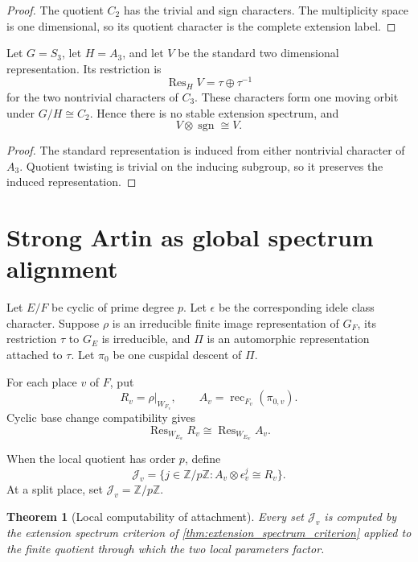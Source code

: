 \documentclass{aomart}
\newtheorem{theorem}{Theorem}[section]
\theoremstyle{definition}
\theoremstyle{remark}
\newcommand{\ZZ}{\mathbb Z}
\newcommand{\Res}{\operatorname{Res}}
\newcommand{\rec}{\operatorname{rec}}
\newcommand{\calJ}{\mathcal J}
\begin{document}
\begin{proof}
The quotient \(C_2\) has the trivial and sign characters. The multiplicity space is one dimensional, so its quotient character is the complete extension label.
\end{proof}

\begin{example}\label{ex:S3_moving_type}
Let \(G=S_3\), let \(H=A_3\), and let \(V\) be the standard two dimensional representation. Its restriction is
\[
 \Res_HV=\tau\oplus\tau^{-1}
\]
for the two nontrivial characters of \(C_3\). These characters form one moving orbit under \(G/H\cong C_2\). Hence there is no stable extension spectrum, and
\[
 V\otimes\operatorname{sgn}\cong V.
\]
\end{example}

\begin{proof}
The standard representation is induced from either nontrivial character of \(A_3\). Quotient twisting is trivial on the inducing subgroup, so it preserves the induced representation.
\end{proof}

\section{Strong Artin as global spectrum alignment}\label{sec:global_alignment}

Let \(E/F\) be cyclic of prime degree \(p\). Let \(\epsilon\) be the corresponding idele class character. Suppose \(\rho\) is an irreducible finite image representation of \(G_F\), its restriction \(\tau\) to \(G_E\) is irreducible, and \(\Pi\) is an automorphic representation attached to \(\tau\). Let \(\pi_0\) be one cuspidal descent of \(\Pi\).

For each place \(v\) of \(F\), put
\[
 R_v=\rho|_{W_{F_v}},
 \qquad
 A_v=\rec_{F_v}(\pi_{0,v}).
\]
Cyclic base change compatibility gives
\[
 \Res_{W_{E_w}}R_v
 \cong
 \Res_{W_{E_w}}A_v.
\]

\begin{definition}\label{def:local_attachment_set}
When the local quotient has order \(p\), define
\[
 \calJ_v
 =
 \{j\in\ZZ/p\ZZ:
 A_v\otimes\epsilon_v^j\cong R_v\}.
\]
At a split place, set \(\calJ_v=\ZZ/p\ZZ\).
\end{definition}

\begin{theorem}[Local computability of attachment]\label{thm:local_attachment_spectrum}
Every set \(\calJ_v\) is computed by the extension spectrum criterion of \cref{thm:extension_spectrum_criterion} applied to the finite quotient through which the two local parameters factor.
\end{theorem}
\end{document}

